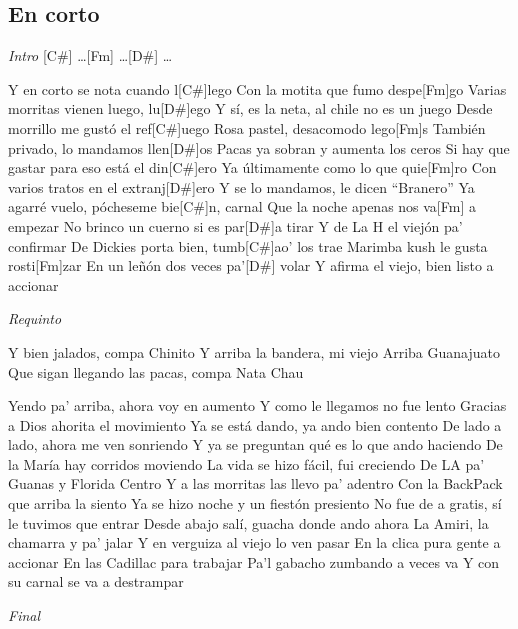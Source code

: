\subsection{En corto}
\noindent

\vspace{1cm}

\begin{guitar}
	\begin{multicols}{2}
		\textit{Intro}
		[C#] \dots [Fm] \dots [D#] \dots \par

		Y en corto se nota cuando l[C#]lego
		Con la motita que fumo despe[Fm]go
		Varias morritas vienen luego, lu[D#]ego
	Y sí, es la neta, al chile no es un juego
	Desde morrillo me gustó el ref[C#]uego
	Rosa pastel, desacomodo lego[Fm]s
	También privado, lo mandamos llen[D#]os
	Pacas ya sobran y aumenta los ceros
	Si hay que gastar para eso está el din[C#]ero
	Ya últimamente como lo que quie[Fm]ro
	Con varios tratos en el extranj[D#]ero
	Y se lo mandamos, le dicen ``Branero''
	Ya agarré vuelo, pócheseme bie[C#]n, carnal
	Que la noche apenas nos va[Fm] a empezar
	No brinco un cuerno si es par[D#]a tirar
	Y de La H el viejón pa' confirmar
	De Dickies porta bien, tumb[C#]ao' los trae
	Marimba kush le gusta rosti[Fm]zar
	En un leñón dos veces pa'[D#] volar
	Y afirma el viejo, bien listo a accionar
	\par
	\textit{Requinto}
	\par
	Y bien jalados, compa Chinito
	Y arriba la bandera, mi viejo
	Arriba Guanajuato
	Que sigan llegando las pacas, compa Nata
	Chau
	\par
	Yendo pa' arriba, ahora voy en aumento
	Y como le llegamos no fue lento
	Gracias a Dios ahorita el movimiento
	Ya se está dando, ya ando bien contento
	De lado a lado, ahora me ven sonriendo
	Y ya se preguntan qué es lo que ando haciendo
	De la María hay corridos moviendo
	La vida se hizo fácil, fui creciendo
	De LA pa' Guanas y Florida Centro
	Y a las morritas las llevo pa' adentro
	Con la BackPack que arriba la siento
	Ya se hizo noche y un fiestón presiento
	No fue de a gratis, sí le tuvimos que entrar
	Desde abajo salí, guacha donde ando ahora
	La Amiri, la chamarra y pa' jalar
	Y en verguiza al viejo lo ven pasar
	En la clica pura gente a accionar
	En las Cadillac para trabajar
	Pa'l gabacho zumbando a veces va
	Y con su carnal se va a destrampar
	\par
		\textit{Final}
	\end{multicols}
\end{guitar}
